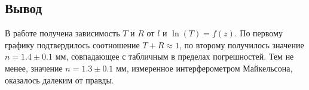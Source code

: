 \documentclass[a4paper,12pt]{article}
\theoremstyle{plain} %
\theoremstyle{definition} %
\theoremstyle{remark} %
\begin{document}
\begin{enumerate}
\section{Вывод}

В работе получена зависимость $T$ и $R$ от $l$ и $\ln(T) = f(z)$. По первому графику подтвердилось соотношение $T+R \approx 1$, по второму получилось значение $n = 1.4 \pm 0.1$ мм, совпадающее с табличным в пределах погрешностей.
Тем не менее, значение $n = 1.3 \pm 0.1 $ мм, измеренное интерферометром Майкельсона, оказалось далеким от правды.






\end{enumerate}
\end{document}
